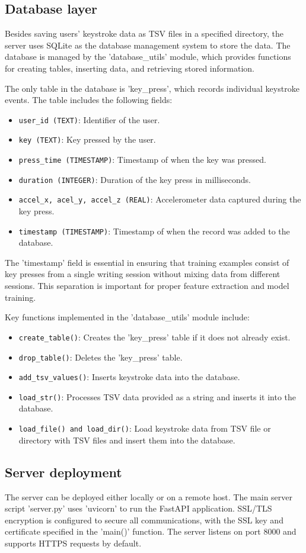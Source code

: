 \subsection{Database layer}
Besides saving users' keystroke data as TSV files in a specified directory, the server uses SQLite as the database management system to store the data. The database is managed by the 'database\_utils' module, which provides functions for creating tables, inserting data, and retrieving stored information.

The only table in the database is 'key\_press', which records individual keystroke events. The table includes the following fields:
\begin{itemize}
    \item \texttt{user\_id (TEXT)}: Identifier of the user.
    \item \texttt{key (TEXT)}: Key pressed by the user.
    \item \texttt{press\_time (TIMESTAMP)}: Timestamp of when the key was pressed.
    \item \texttt{duration (INTEGER)}: Duration of the key press in milliseconds.
    \item \texttt{accel\_x, acel\_y, accel\_z (REAL)}: Accelerometer data captured during the key press.
    \item \texttt{timestamp (TIMESTAMP)}: Timestamp of when the record was added to the database.
\end{itemize}
The 'timestamp' field is essential in ensuring that training examples consist of key presses from a single writing session without mixing data from different sessions. This separation is important for proper feature extraction and model training.

Key functions implemented in the 'database\_utils' module include:
\begin{itemize}
    \item \texttt{create\_table()}: Creates the 'key\_press' table if it does not already exist.
    \item \texttt{drop\_table()}: Deletes the 'key\_press' table.
    \item \texttt{add\_tsv\_values()}: Inserts keystroke data into the database.
    \item \texttt{load\_str()}: Processes TSV data provided as a string and inserts it into the database.
    \item \texttt{load\_file() and load\_dir()}: Load keystroke data from TSV file or directory with TSV files and insert them into the database.
\end{itemize}

\subsection{Server deployment}
The server can be deployed either locally or on a remote host. The main server script 'server.py' uses 'uvicorn' to run the FastAPI application. SSL/TLS encryption is configured to secure all communications, with the SSL key and certificate specified in the 'main()' function. The server listens on port 8000 and supports HTTPS requests by default.